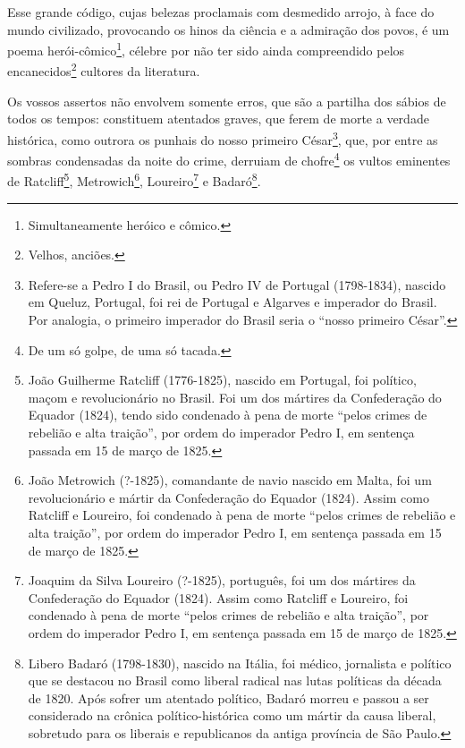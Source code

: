 Esse grande código, cujas belezas proclamais com desmedido arrojo, à
face do mundo civilizado, provocando os hinos da ciência e a admiração
dos povos, é um poema herói-cômico\footnote{Simultaneamente heróico e
  cômico.}, célebre por não ter sido ainda compreendido pelos
encanecidos\footnote{Velhos, anciões.} cultores da literatura.

Os vossos assertos não envolvem somente erros, que são a partilha dos
sábios de todos os tempos: constituem atentados graves, que ferem de
morte a verdade histórica, como outrora os punhais do nosso primeiro
César\footnote{Refere-se a Pedro I do Brasil, ou Pedro IV de Portugal
  (1798-1834), nascido em Queluz, Portugal, foi rei de Portugal e
  Algarves e imperador do Brasil. Por analogia, o primeiro imperador do
  Brasil seria o ``nosso primeiro César''.}, que, por entre as sombras
condensadas da noite do crime, derruiam de chofre\footnote{De um só
  golpe, de uma só tacada.} os vultos eminentes de Ratcliff\footnote{
  João Guilherme Ratcliff (1776-1825), nascido em Portugal, foi
  político, maçom e revolucionário no Brasil. Foi um dos mártires da
  Confederação do Equador (1824), tendo sido condenado à pena de morte
  ``pelos crimes de rebelião e alta traição'', por ordem do imperador
  Pedro I, em sentença passada em 15 de março de 1825.},
Metrowich\footnote{João Metrowich (?-1825), comandante de navio
  nascido em Malta, foi um revolucionário e mártir da Confederação do
  Equador (1824). Assim como Ratcliff e Loureiro, foi condenado à pena
  de morte ``pelos crimes de rebelião e alta traição'', por ordem do
  imperador Pedro I, em sentença passada em 15 de março de 1825.},
Loureiro\footnote{Joaquim da Silva Loureiro (?-1825), português, foi
  um dos mártires da Confederação do Equador (1824). Assim como Ratcliff
  e Loureiro, foi condenado à pena de morte ``pelos crimes de rebelião e
  alta traição'', por ordem do imperador Pedro I, em sentença passada em
  15 de março de 1825.} e Badaró\footnote{Libero Badaró (1798-1830),
  nascido na Itália, foi médico, jornalista e político que se destacou
  no Brasil como liberal radical nas lutas políticas da década de 1820.
  Após sofrer um atentado político, Badaró morreu e passou a ser
  considerado na crônica político-histórica como um mártir da causa
  liberal, sobretudo para os liberais e republicanos da antiga província
  de São Paulo.}.

